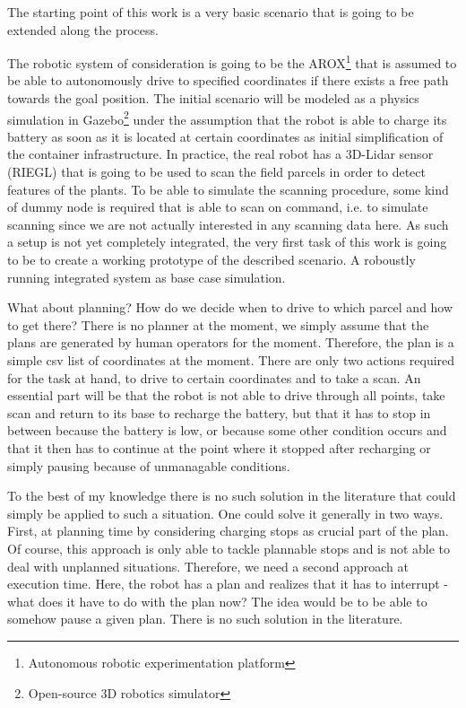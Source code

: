\documentclass[german, master, expose, latin1]{base/thesis_KBS}
\begin{document}
The starting point of this work is a very basic scenario that is going to be extended along the process.\newline

The robotic system of consideration is going to be the AROX\footnote{Autonomous robotic experimentation platform} that is assumed to be able to autonomously drive to specified
coordinates if there exists a free path towards the goal position. The initial scenario will be modeled as a physics simulation in Gazebo\footnote{Open-source 3D robotics simulator} 
under the assumption that the robot is able to charge its battery as soon as it is located at certain coordinates as initial simplification of the container infrastructure.
In practice, the real robot has a 3D-Lidar sensor (RIEGL) that is going to be used to scan the field parcels in order to detect features of the plants.
To be able to simulate the scanning procedure, some kind of dummy node is required that is able to scan on command, i.e. to simulate scanning since we are not actually
interested in any scanning data here. As such a setup is not yet completely integrated, the very first task of this work is going to be to create a working prototype of
the described scenario. A roboustly running integrated system as base case simulation.\newline

What about planning? How do we decide when to drive to which parcel and how to get there? There is no planner at the moment, we simply assume that the plans
are generated by human operators for the moment. Therefore, the plan is a simple csv list of coordinates at the moment. There are only two actions required for
the task at hand, to drive to certain coordinates and to take a scan. An essential part will be that the robot is not able to drive through all points, take scan and
return to its base to recharge the battery, but that it has to stop in between because the battery is low, or because some other condition occurs
and that it then has to continue at the point where it stopped after recharging or simply pausing because of unmanagable conditions.\newline

To the best of my knowledge there is no such solution in the literature that could simply be applied to such a situation.
One could solve it generally in two ways. First, at planning time by considering charging stops as crucial part of the plan. Of course, this approach
is only able to tackle plannable stops and is not able to deal with unplanned situations. Therefore, we need a second approach at execution time.
Here, the robot has a plan and realizes that it has to interrupt - what does it have to do with the plan now? The idea would be to be able to somehow
pause a given plan. There is no such solution in the literature.\newline
\end{document}
